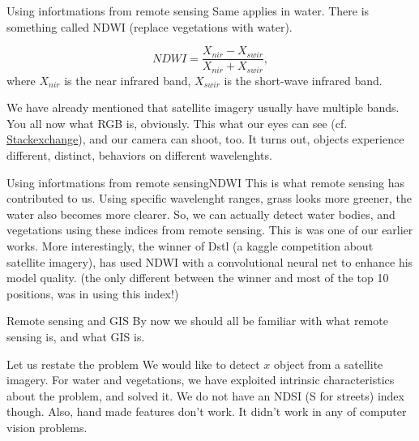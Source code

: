 \documentclass{beamer}
\begin{document}
\begin{frame}{Using infortmations from remote sensing}
 Same applies in water. There is something called NDWI (replace vegetations with
 water).

 \begin{equation}
   \label{eq:ndwi}
   NDWI = \frac{X_{nir} - X_{swir}}{X_{nir} + X_{swir}},
 \end{equation}
 where $X_{nir}$ is the near infrared band, $X_{swir}$ is the short-wave
 infrared band.

 We have already mentioned that satellite imagery usually have multiple bands.
 You all now what RGB is, obviously. This what our eyes can see (cf.
 \href{https://physics.stackexchange.com/questions/209854/why-cant-we-see-infrared-light}{Stackexchange}),
 and our camera can shoot, too. It turns out, objects experience different,
 distinct, behaviors on different wavelenghts.
\end{frame}

\begin{frame}{Using infortmations from remote sensing}{NDWI}
  This is what remote sensing has contributed to us. Using specific wavelenght
  ranges, grass looks more greener, the water also becomes more clearer. So, we
  can actually detect water bodies, and vegetations using these indices from
  remote sensing. This is was one of our earlier works. More interestingly, the
  winner of Dstl (a kaggle competition about satellite imagery), has used NDWI
  with a convolutional neural net to enhance his model quality. (the only
  different between the winner and most of the top 10 positions, was in using
  this index!)
\end{frame}

\begin{frame}{Remote sensing and GIS}
By now we should all be familiar with what remote sensing is, and what GIS is.
\end{frame}

\begin{frame}{Let us restate the problem}
We would like to detect $x$ object from a satellite imagery. For water and
vegetations, we have exploited intrinsic characteristics about the problem, and
solved it. We do not have an NDSI (S for streets) index though. Also, hand made
features don't work. It didn't work in any of computer vision problems. 
\end{frame}
\end{document}
